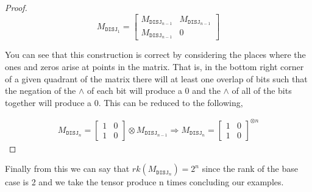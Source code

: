 \documentclass[usletter]{article}
\begin{document}
\begin{example}
\begin{proof}
      \begin{equation*}
        M_{\mathtt{DISJ}_1} =
        \begin{bmatrix}
          M_{\mathtt{DISJ}_{n-1}} & M_{\mathtt{DISJ}_{n-1}} \\
          M_{\mathtt{DISJ}_{n-1}} & 0
        \end{bmatrix}
      \end{equation*}

      You can see that this construction is correct by considering the places where the ones and zeros arise at points in the matrix. That is, in the bottom right corner of a given quadrant of the matrix there will at least one overlap of bits such that the negation of the $\land$ of each bit will produce a 0 and the $\land$ of all of the bits together will produce a 0. This can be reduced to the following,

      \begin{align*}
        M_{\mathtt{DISJ}_n} =
        \begin{bmatrix}
          1 & 0 \\
          1 & 0
        \end{bmatrix}
        \otimes
        M_{\mathtt{DISJ}_{n-1}}
        \Rightarrow
        M_{\mathtt{DISJ}_n} =
        \begin{bmatrix}
          1 & 0 \\
          1 & 0
        \end{bmatrix} ^{\otimes n}
      \end{align*}
  \end{proof}

      Finally from this we can say that $rk(M_{\mathtt{DISJ}_n}) = 2^n$ since the rank of the base case is 2 and we take the tensor produce n times concluding our examples.
\end{example}


\end{document}
